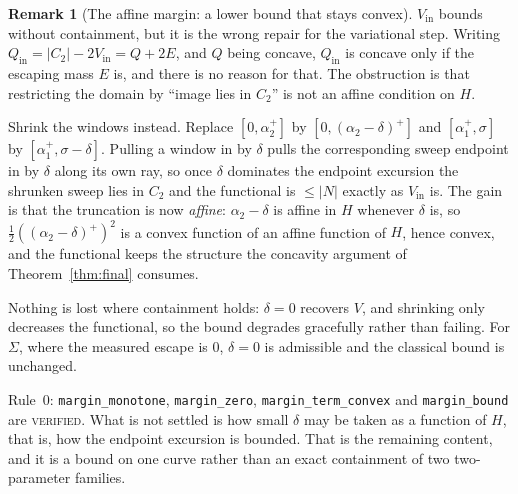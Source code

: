 \documentclass[11pt]{article}
\theoremstyle{definition}
\newtheorem{remark}[theorem]{Remark}
\newcommand{\Sig}{\Sigma}
\begin{document}
\begin{remark}[The affine margin: a lower bound that stays convex]\label{rem:v17}
$V_{\mathrm{in}}$ bounds without containment, but it is the wrong repair for the variational
step. Writing $Q_{\mathrm{in}}=|C_2|-2V_{\mathrm{in}}=Q+2E$, and $Q$ being concave,
$Q_{\mathrm{in}}$ is concave only if the escaping mass $E$ is, and there is no reason for
that. The obstruction is that restricting the domain by ``image lies in $C_2$'' is not an
affine condition on $H$.

Shrink the windows instead. Replace $[0,\alpha_2^+]$ by $[0,(\alpha_2-\delta)^+]$ and
$[\alpha_1^+,\sigma]$ by $[\alpha_1^+,\sigma-\delta]$. Pulling a window in by $\delta$ pulls
the corresponding sweep endpoint in by $\delta$ along its own ray, so once $\delta$ dominates
the endpoint excursion the shrunken sweep lies in $C_2$ and the functional is $\le|N|$ exactly
as $V_{\mathrm{in}}$ is. The gain is that the truncation is now \emph{affine}:
$\alpha_2-\delta$ is affine in $H$ whenever $\delta$ is, so $\tfrac12((\alpha_2-\delta)^+)^2$
is a convex function of an affine function of $H$, hence convex, and the functional keeps the
structure the concavity argument of Theorem~\ref{thm:final} consumes.

Nothing is lost where containment holds: $\delta=0$ recovers $V$, and shrinking only decreases
the functional, so the bound degrades gracefully rather than failing. For $\Sig$, where the
measured escape is $0$, $\delta=0$ is admissible and the classical bound is unchanged.

Rule~0: \verb|margin_monotone|, \verb|margin_zero|, \verb|margin_term_convex| and
\verb|margin_bound| are \textsc{verified}. What is not settled is how small $\delta$ may be
taken as a function of $H$, that is, how the endpoint excursion is bounded. That is the
remaining content, and it is a bound on one curve rather than an exact containment of two
two-parameter families.
\end{remark}
\end{document}
